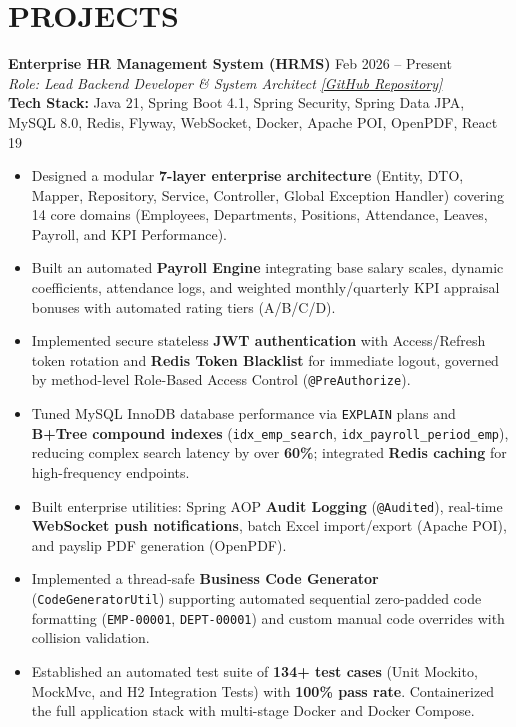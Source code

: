 ﻿\documentclass[10pt,a4paper]{article}
\begin{document}
\section*{PROJECTS}
\noindent
\textbf{Enterprise HR Management System (HRMS)} \hfill Feb 2026 -- Present \\
\textit{Role: Lead Backend Developer \& System Architect} \hfill \href{https://github.com/ng-doanh/hr-management-system}{\textit{[GitHub Repository]}} \\
\textbf{Tech Stack:} Java 21, Spring Boot 4.1, Spring Security, Spring Data JPA, MySQL 8.0, Redis, Flyway, WebSocket, Docker, Apache POI, OpenPDF, React 19
\begin{itemize}
    \item Designed a modular \textbf{7-layer enterprise architecture} (Entity, DTO, Mapper, Repository, Service, Controller, Global Exception Handler) covering 14 core domains (Employees, Departments, Positions, Attendance, Leaves, Payroll, and KPI Performance).
    \item Built an automated \textbf{Payroll Engine} integrating base salary scales, dynamic coefficients, attendance logs, and weighted monthly/quarterly KPI appraisal bonuses with automated rating tiers (A/B/C/D).
    \item Implemented secure stateless \textbf{JWT authentication} with Access/Refresh token rotation and \textbf{Redis Token Blacklist} for immediate logout, governed by method-level Role-Based Access Control (\texttt{@PreAuthorize}).
    \item Tuned MySQL InnoDB database performance via \texttt{EXPLAIN} plans and \textbf{B+Tree compound indexes} (\texttt{idx\_emp\_search}, \texttt{idx\_payroll\_period\_emp}), reducing complex search latency by over \textbf{60\%}; integrated \textbf{Redis caching} for high-frequency endpoints.
    \item Built enterprise utilities: Spring AOP \textbf{Audit Logging} (\texttt{@Audited}), real-time \textbf{WebSocket push notifications}, batch Excel import/export (Apache POI), and payslip PDF generation (OpenPDF).
    \item Implemented a thread-safe \textbf{Business Code Generator} (\texttt{CodeGeneratorUtil}) supporting automated sequential zero-padded code formatting (\texttt{EMP-00001}, \texttt{DEPT-00001}) and custom manual code overrides with collision validation.
    \item Established an automated test suite of \textbf{134+ test cases} (Unit Mockito, MockMvc, and H2 Integration Tests) with \textbf{100\% pass rate}. Containerized the full application stack with multi-stage Docker and Docker Compose.
\end{itemize}
\end{document}
